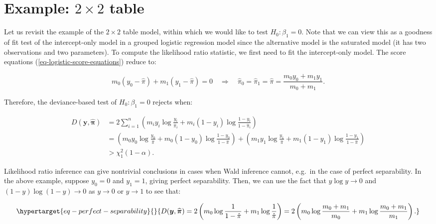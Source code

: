 \documentclass[
  11pt,
  letterpaper,
  oneside]{book}
\theoremstyle{definition}
\theoremstyle{plain}
\theoremstyle{plain}
\theoremstyle{plain}
\theoremstyle{remark}
\begin{document}
\hypertarget{sec-example-2x2-table}{%
\section{\texorpdfstring{Example: \(2 \times 2\)
table}{Example: 2 \textbackslash times 2 table}}\label{sec-example-2x2-table}}

Let us revisit the example of the \(2 \times 2\) table model, within
which we would like to test \(H_0: \beta_1 = 0\). Note that we can view
this as a goodness of fit test of the intercept-only model in a grouped
logistic regression model since the alternative model is the saturated
model (it has two observations and two parameters). To compute the
likelihood ratio statistic, we first need to fit the intercept-only
model. The score equations (\ref{eq-logistic-score-equations}) reduce
to:

\[
m_0 (y_0 - \hat \pi) + m_1 (y_1 - \hat \pi) = 0 \quad \Longrightarrow \quad \hat \pi_0 = \hat \pi_1 = \hat \pi = \frac{m_0 y_0 + m_1 y_1}{m_0 + m_1}.
\]

Therefore, the deviance-based test of \(H_0: \beta_1 = 0\) rejects when:

\[
\begin{split}
D(\boldsymbol{y}, \boldsymbol{\widehat \pi}) &= 2\sum_{i = 1}^n \left(m_i y_i \log \frac{y_i}{\widehat \pi_i} + m_i(1-y_i) \log\frac{1-y_i}{1-\widehat \pi_i}\right) \\
&= \left(m_0 y_0 \log\frac{y_0}{\hat \pi} + m_0(1-y_0)\log\frac{1-y_0}{1-\hat \pi}\right) + \left(m_1 y_1 \log\frac{y_1}{\hat \pi} + m_1(1-y_1)\log\frac{1-y_1}{1-\hat \pi}\right) \\
&> \chi^2_{1}(1-\alpha).
\end{split}
\]

Likelihood ratio inference can give nontrivial conclusions in cases when
Wald inference cannot, e.g.~in the case of perfect separability. In the
above example, suppose \(y_0 = 0\) and \(y_1 = 1\), giving perfect
separability. Then, we can use the fact that \(y \log y \rightarrow 0\)
and \((1-y)\log(1-y) \rightarrow 0\) as \(y \rightarrow 0\) or
\(y \rightarrow 1\) to see that:

\begin{equation}\protect\hypertarget{eq-perfect-separability}{}{
D(\boldsymbol{y}, \boldsymbol{\widehat \pi}) = 2\left(m_0 \log\frac{1}{1-\hat \pi} + m_1 \log\frac{1}{\hat \pi}\right) = 2\left(m_0 \log \frac{m_0 + m_1}{m_0} + m_1 \log \frac{m_0 + m_1}{m_1}\right).
}\label{eq-perfect-separability}\end{equation}
\end{document}
